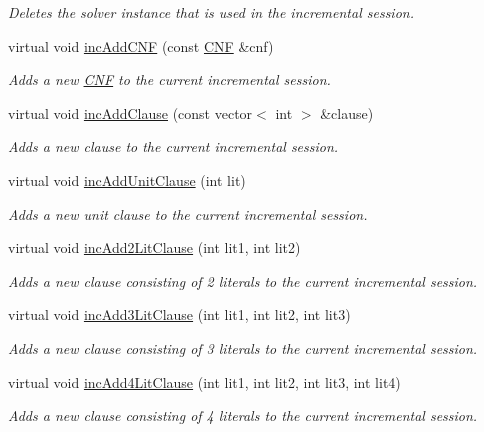 \begin{DoxyCompactItemize}
\begin{DoxyCompactList}\small\item\em Deletes the solver instance that is used in the incremental session. \end{DoxyCompactList}\item 
virtual void \hyperlink{classLingelingApi_ae9e54e64007c98add90e142a5c38d4bc}{inc\-Add\-C\-N\-F} (const \hyperlink{classCNF}{C\-N\-F} \&cnf)
\begin{DoxyCompactList}\small\item\em Adds a new \hyperlink{classCNF}{C\-N\-F} to the current incremental session. \end{DoxyCompactList}\item 
virtual void \hyperlink{classLingelingApi_afb3e0d0ab541b89ef6c281145f53105f}{inc\-Add\-Clause} (const vector$<$ int $>$ \&clause)
\begin{DoxyCompactList}\small\item\em Adds a new clause to the current incremental session. \end{DoxyCompactList}\item 
virtual void \hyperlink{classLingelingApi_aa5c928ad16d2dc79d42b977237d377e0}{inc\-Add\-Unit\-Clause} (int lit)
\begin{DoxyCompactList}\small\item\em Adds a new unit clause to the current incremental session. \end{DoxyCompactList}\item 
virtual void \hyperlink{classLingelingApi_a54bf3198e6bb2dd3ebda768272337955}{inc\-Add2\-Lit\-Clause} (int lit1, int lit2)
\begin{DoxyCompactList}\small\item\em Adds a new clause consisting of 2 literals to the current incremental session. \end{DoxyCompactList}\item 
virtual void \hyperlink{classLingelingApi_ad05f795bbf472fe5386164a74a8ecd86}{inc\-Add3\-Lit\-Clause} (int lit1, int lit2, int lit3)
\begin{DoxyCompactList}\small\item\em Adds a new clause consisting of 3 literals to the current incremental session. \end{DoxyCompactList}\item 
virtual void \hyperlink{classLingelingApi_a464ae182ba0c0fd7255db821f92d127d}{inc\-Add4\-Lit\-Clause} (int lit1, int lit2, int lit3, int lit4)
\begin{DoxyCompactList}\small\item\em Adds a new clause consisting of 4 literals to the current incremental session. \end{DoxyCompactList}\item 

\end{DoxyCompactItemize}
